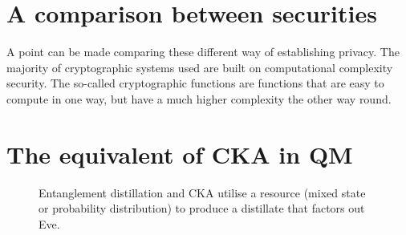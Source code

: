 \section{A comparison between securities}
    A point can be made comparing these different way of establishing privacy.
    The majority of cryptographic systems used are built on computational complexity security. 
    The so-called cryptographic functions are functions that are easy to compute in one way, but have a much higher complexity the other way round.\\
    
\section{The equivalent of CKA in QM}
    
    \begin{figure}[h]
    	\centering
    	
    	\caption{Entanglement distillation and CKA utilise a resource (mixed state or probability distribution) to produce a distillate that factors out Eve.}
    	\label{Fig:intuition}
    \end{figure}